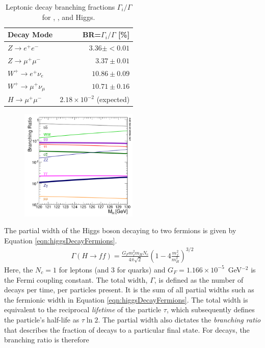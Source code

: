 \begin{table}[htp]
\begin{center}
\begin{tabular}{l r}
\toprule
Decay Mode & BR=$\Gamma_i/\Gamma$ [\%] \\
\midrule
$Z\to e^+e^-$           & $3.36\pm<0.01$ \\
$Z\to \mu^+\mu^-$       & $3.37\pm0.01 $ \\
$W^+\to   e^+\nu_e$     & $10.86\pm0.09$ \\
$W^+\to \mu^+\nu_\mu$   & $10.71\pm0.16$ \\
$H\to \mu^+\mu^-$       & $2.18\times10^{-2}$ (expected) \\
\bottomrule
\end{tabular}
\caption{Leptonic decay branching fractions $\Gamma_i/\Gamma$ for \W, \Z, and Higgs. \cite{pdg2018}}
\label{tab:decayCrossSec}
\end{center}
\end{table}

\begin{figure}[h!]
\captionsetup[subfigure]{position=b}
\centering
\includegraphics[width=0.5\textwidth]{figures/pheno/higgsBr.png}
\caption{}
\label{fig:higgsBr}
\end{figure}

The partial width of the Higgs boson decaying to two fermions is given by Equation \ref{eqn:higgsDecayFermions}.
\begin{equation}\begin{split}\label{eqn:higgsDecayFermions}
\Gamma(H\to ff)=\frac{G_Fm_f^2m_HN_c}{4\pi\sqrt{2}}(1-4\frac{m_f^2}{m_H^2})^{3/2}
\end{split}\end{equation} 
Here, the $N_c=1$ for leptons (and 3 for quarks) and $G_F=1.166\times10^{-5}$~GeV$^{-2}$ is the Fermi coupling constant.
The total width, $\Gamma$, is defined as the number of decays per time, per particles present.
It is the sum of all partial widths such as the fermionic width in Equation \ref{eqn:higgsDecayFermions}.
The total width is equivalent to the reciprocal \emph{lifetime} of the particle $\tau$, which subsequently defines the particle's half-life as $\tau\ln2$.
The partial width also dictates the \emph{branching ratio} that describes the fraction of decays to a particular final state.
For \hmm decays, the branching ratio is therefore

